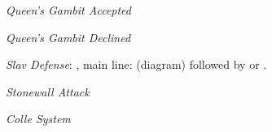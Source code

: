 \begin{minipage}[t]{.225\linewidth}
\raggedright
\begin{center}
\scalebox{.700}{\showboard}
\end{center}
\newgame
\emph{Queen's Gambit Accepted}\vspace{2mm}
\end{minipage}
\hspace{5mm}
\begin{minipage}[t]{.225\linewidth}
\raggedright
\begin{center}
\scalebox{.700}{\showboard}
\end{center}
\newgame
\emph{Queen's Gambit Declined}
\vspace{2mm}
\end{minipage}
\hspace{5mm}
\begin{minipage}[t]{.225\linewidth}
\raggedright
\begin{center}
\scalebox{.700}{\showboard}
\end{center}
\newgame
\emph{Slav Defense}: , main line:  (diagram) followed by  or .\vspace{2mm}
\end{minipage}
\hspace{5mm}
\begin{minipage}[t]{.225\linewidth}
\raggedright
\begin{center}
\scalebox{.700}{\showboard}
\end{center}
\newgame
\emph{Stonewall Attack}
\vspace{2mm}
\end{minipage}
\newline
\begin{minipage}[t]{.225\linewidth}
\raggedright
\begin{center}
\scalebox{.700}{\showboard}
\end{center}
\newgame
\emph{Colle System}\vspace{2mm}
\end{minipage}
\hspace{5mm}


